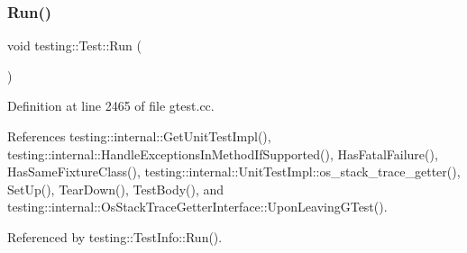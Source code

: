 \subsubsection{\texorpdfstring{Run()}{Run()}}
{\footnotesize\ttfamily void testing\+::\+Test\+::\+Run (\begin{DoxyParamCaption}{ }\end{DoxyParamCaption})\hspace{0.3cm}{\ttfamily [private]}}



Definition at line 2465 of file gtest.\+cc.



References testing\+::internal\+::\+Get\+Unit\+Test\+Impl(), testing\+::internal\+::\+Handle\+Exceptions\+In\+Method\+If\+Supported(), Has\+Fatal\+Failure(), Has\+Same\+Fixture\+Class(), testing\+::internal\+::\+Unit\+Test\+Impl\+::os\+\_\+stack\+\_\+trace\+\_\+getter(), Set\+Up(), Tear\+Down(), Test\+Body(), and testing\+::internal\+::\+Os\+Stack\+Trace\+Getter\+Interface\+::\+Upon\+Leaving\+G\+Test().



Referenced by testing\+::\+Test\+Info\+::\+Run().


